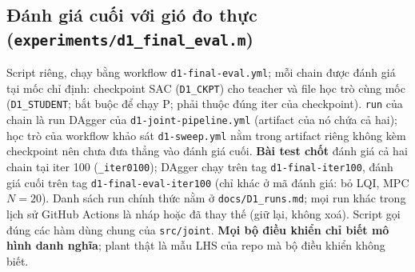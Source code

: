 \documentclass[11pt]{article}
\begin{document}
\subsection{Đánh giá cuối với gió đo thực (\texttt{experiments/d1\_final\_eval.m})}
Script riêng, chạy bằng workflow \texttt{d1-final-eval.yml}; mỗi chain được đánh giá tại mốc chỉ định: checkpoint
SAC (\texttt{D1\_CKPT}) cho teacher và file học trò cùng mốc (\texttt{D1\_STUDENT}; bắt buộc để chạy P; phải
thuộc đúng iter của checkpoint). \texttt{run} của chain là run DAgger của \texttt{d1-joint-pipeline.yml} (artifact
của nó chứa cả hai); học trò của workflow khảo sát \texttt{d1-sweep.yml} nằm trong artifact riêng không kèm
checkpoint nên chưa đưa thẳng vào đánh giá cuối. \textbf{Bài test chốt} đánh giá cả hai chain tại iter 100
(\texttt{\_iter0100}); DAgger chạy trên tag \texttt{d1-final-iter100}, đánh giá cuối trên tag
\texttt{d1-final-eval-iter100} (chỉ khác ở mã đánh giá: bỏ LQI, MPC $N=20$). Danh sách run chính
thức nằm ở \texttt{docs/D1\_runs.md}; mọi run khác trong lịch sử GitHub Actions là nháp hoặc đã thay thế (giữ
lại, không xoá). Script gọi
đúng các hàm dùng chung của \texttt{src/joint}. \textbf{Mọi bộ điều khiển chỉ biết mô hình danh nghĩa}; plant
thật là mẫu LHS của repo mà bộ điều khiển không biết.
\end{document}
